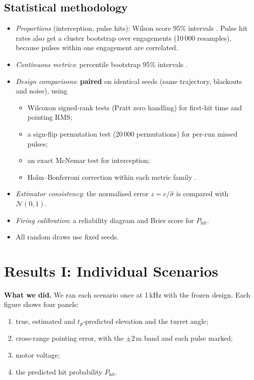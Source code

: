 \documentclass[11pt,a4paper]{article}
\newcommand{\Phit}{P_{\mathrm{hit}}}
\begin{document}
\subsection{Statistical methodology}
\begin{itemize}
\item \emph{Proportions} (interception, pulse hits): Wilson score 95\% intervals \cite{wilson1927}. Pulse hit rates also get a cluster bootstrap over engagements (10\,000 resamples), because pulses within one engagement are correlated.
\item \emph{Continuous metrics}: percentile bootstrap 95\% intervals \cite{efron1993}.
\item \emph{Design comparisons}: \textbf{paired} on identical seeds (same trajectory, blackouts and noise), using
  \begin{itemize}
  \item Wilcoxon signed-rank tests \cite{wilcoxon1945} (Pratt zero handling) for first-hit time and pointing RMS;
  \item a sign-flip permutation test (20\,000 permutations) for per-run missed pulses;
  \item an exact McNemar test for interception;
  \item Holm--Bonferroni correction within each metric family \cite{holm1979}.
  \end{itemize}
\item \emph{Estimator consistency}: the normalised error $z=e/\hat\sigma$ is compared with $\mathcal N(0,1)$.
\item \emph{Firing calibration}: a reliability diagram and Brier score for $\Phit$.
\item All random draws use fixed seeds.
\end{itemize}

\section{Results I: Individual Scenarios}
\textbf{What we did.} We ran each scenario once at 1\,kHz with the frozen design. Each figure shows four panels:
\begin{enumerate}
\item true, estimated and $t_p$-predicted elevation and the turret angle;
\item cross-range pointing error, with the $\pm2$\,m band and each pulse marked;
\item motor voltage;
\item the predicted hit probability $\Phit$.
\end{enumerate}
\end{document}
